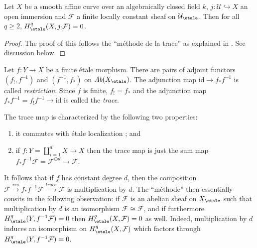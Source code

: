 \begin{lemma}
\label{lemma-vanishing-easier}
Let $X$ be a smooth affine curve over an algebraically closed field $k$, $j:
\mathcal{U} \hookrightarrow X$ an open immersion and $\mathcal{F}$ a finite
locally constant sheaf on $\mathcal{U}_\etale$. Then for all
$q \geq 2$, $H_\etale^q(X, j_! \mathcal{F}) = 0$.
\end{lemma}

\begin{proof}
The proof of this follows the
``m\'ethode de la trace''
as explained in \cite[Expos\'e IX, \S5]{SGA4}.
See discussion below.
\end{proof}

\begin{definition}
\label{definition-trace-map}
Let $f : Y \to X$ be a finite \'etale morphism. There are pairs of adjoint
functors $(f_!, f^{-1})$ and $(f^{-1}, f_*)$ on
$\textit{Ab}(X_\etale)$. The
adjunction map $\text{id} \to f_* f^{-1}$ is called {\it restriction}. Since
$f$ is finite, $f_! = f_*$ and the adjunction map $f_* f^{-1} = f_! f^{-1} \to
\text{id}$ is called the {\it trace}.
\end{definition}

\noindent
The trace map is characterized by the following two properties:
\begin{enumerate}
\item
it commutes with \'etale localization ; and
\item
if $f: Y = \coprod_{i=1}^d X \to X$ then the trace map is just the sum map
$f_*f^{-1} \mathcal{F} = \mathcal{F}^{\oplus d} \to \mathcal{F}$.
\end{enumerate}
It follows that if $f$ has constant degree $d$, then the composition
$\mathcal{F} \xrightarrow{res} f_* f^{-1} \mathcal{F} \xrightarrow{trace}
\mathcal{F}$ is multiplication by $d$. The ``m\'ethode'' then essentially
consits in the following observation: if $\mathcal{F}$ is an abelian sheaf on
$X_\etale$ such that multiplication by $d$ is an isomorphism
$\mathcal{F} \cong \mathcal{F}$, and if furthermore
$H_\etale^q(Y, f^{-1}\mathcal{F}) = 0$ then
$H_\etale^q(X, \mathcal{F}) = 0$ as well.
Indeed, multiplication by $d$ induces an
isomorphism on $H_\etale^q(X, \mathcal{F})$ which factors through
$H_\etale^q(Y, f^{-1}\mathcal{F})= 0$.

